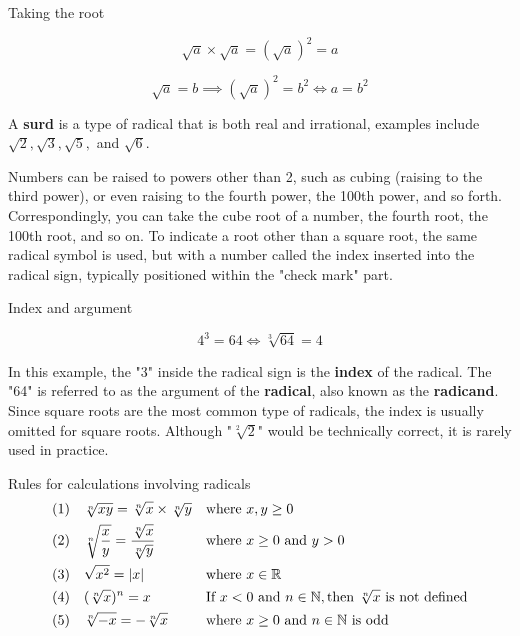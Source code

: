 \begin{example} Taking the root

\[
\sqrt{a} \times \sqrt{a} = (\sqrt{a})^2 = a
\]

\[
\sqrt{a} = b \implies (\sqrt{a})^2 = b^2 \iff a = b^2
\]    
\end{example}



A \textbf{surd} is a type of radical that is both real and irrational, examples include \(\sqrt{2}, \sqrt{3}, \sqrt{5},\) and \(\sqrt{6}\).

Numbers can be raised to powers other than 2, such as cubing (raising to the third power), or even raising to the fourth power, the 100th power, and so forth. Correspondingly, you can take the cube root of a number, the fourth root, the 100th root, and so on. To indicate a root other than a square root, the same radical symbol is used, but with a number called the index inserted into the radical sign, typically positioned within the "check mark" part.

\begin{example} Index and argument

\[
4^3 = 64 \iff \sqrt[3]{64} = 4
\]
   
\end{example}

In this example, the "3" inside the radical sign is the \textbf{index} of the radical. The "64" is referred to as the argument of the \textbf{radical}, also known as the \textbf{radicand}. Since square roots are the most common type of radicals, the index is usually omitted for square roots. Although "\(\sqrt[2]{2}\)" would be technically correct, it is rarely used in practice.
\begin{custombox}{Rules for calculations involving radicals}
    \begin{align*}
    &(1) \quad \sqrt[n]{x y}=\sqrt[n]{x} \times \sqrt[n]{y}   &   &\textnormal{where } x,y \geq 0\\
    &(2) \quad \sqrt[n]{\frac{x}{y}} = \frac{\sqrt[n]{x}}{\sqrt[n]{y}}    &   &\textnormal{where } x \geq 0 \textnormal{ and } y > 0 \\
    &(3) \quad \sqrt{x^2} = |x|   &   &\textnormal{where } x \in \mathbb{R} \\
    &(4) \quad (\sqrt[n]{x})^n = x    &   &\textnormal{If } x < 0 \textnormal{ and } n \in \mathbb{N}, \textnormal{then } \sqrt[n]{x} \textnormal{ is not defined}\\
    &(5) \quad \sqrt[n]{-x}=-\sqrt[n]{x}  &   &\textnormal{where } x \geq 0 \textnormal{ and } n \in \mathbb{N} \textnormal{ is odd }
    \end{align*}
\end{custombox}


